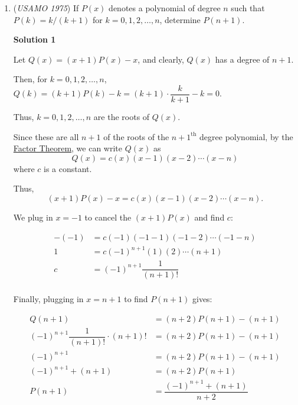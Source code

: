 \begin{enumerate}
 1. Equality holds when the vector equality $a + b = c + d$ holds, which occurs when A, B, C, and D are the vertices of a (planar) parallelogram, in that order.

 2. The algebra employed here is almost identical to the algebra used in Solution 3, which means that Solution 3 is just a simplification of this solution.

 
<i>Alternate solutions are always welcome. If you have a different, elegant solution to this problem, please \href{https://artofproblemsolving.com/wiki/index.php?title=1975\_USAMO\_Problems/Problem\_2&action=edit}{add it} to this page.</i>



	\item (\textit{USAMO 1975}) If $P(x)$ denotes a polynomial of degree $n$ such that $P(k)=k/(k+1)$ for $k=0,1,2,\ldots,n$, determine $P(n+1)$.


 



\textbf{Solution 1}

Let $Q(x) = (x+1)P(x) - x$, and clearly, $Q(x)$ has a degree of $n+1$. 

 Then, for $k=0,1,2,\ldots,n$, $Q(k) = (k+1)P(k) - k = (k+1)\cdot \dfrac{k}{k+1} - k = 0$. 

 Thus, $k=0,1,2,\ldots,n$ are the roots of $Q(x)$. 

 Since these are all $n+1$ of the roots of the $n+1^{\text{th}}$ degree polynomial, by the \href{https://artofproblemsolving.com/wiki/index.php?title=Factor\_Theorem}{Factor Theorem}, we can write $Q(x)$ as 
 \[Q(x) = c(x)(x-1)(x-2) \cdots (x-n)\] where $c$ is a constant. 

 Thus, 
 \[(x+1)P(x) - x = c(x)(x-1)(x-2) \cdots (x-n).\]

 We plug in $x = -1$ to cancel the $(x+1)P(x)$ and find $c$: 

 
 \begin{align*} -(-1) &= c(-1)(-1-1)(-1-2) \cdots (-1-n) \\ 1 &= c(-1)^{n+1}(1)(2) \cdots (n+1) \\ c &= (-1)^{n+1}\dfrac{1}{(n+1)!} \\ \end{align*}


 Finally, plugging in $x = n+1$ to find $P(n+1)$ gives: 

 
 \begin{align*} Q(n+1)&=(n+2)P(n+1)-(n+1)\\ (-1)^{n+1}\dfrac{1}{(n+1)!}\cdot(n+1)! &=(n+2)P(n+1)-(n+1)\\ (-1)^{n+1}&=(n+2)P(n+1)-(n+1)\\ (-1)^{n+1}+(n+1)&=(n+2)P(n+1)\\ P(n+1) &= \dfrac{(-1)^{n+1} + (n+1)}{n+2}\\ \end{align*}



\end{enumerate}
